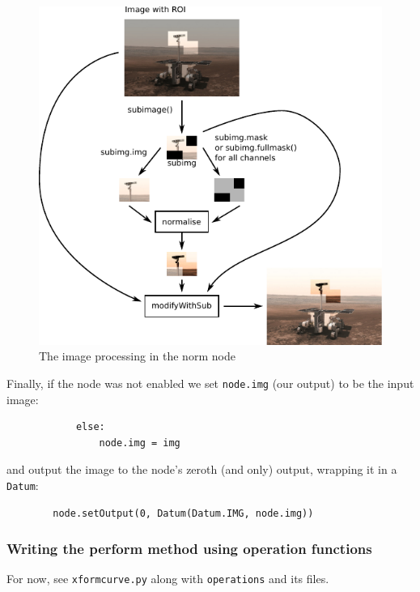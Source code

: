 \begin{figure}[ht]
\center
\includegraphics[width=5in]{norm.pdf}
\caption{The image processing in the norm node}
\label{norm.pdf}
\end{figure}
\clearpage
Finally, if the node was not enabled we set \texttt{node.img} (our output)
to be the input image:
\begin{lstlisting}
            else:
                node.img = img
\end{lstlisting}
and output the image to the node's zeroth (and only) output, wrapping it in
a \texttt{Datum}:
\begin{lstlisting}
        node.setOutput(0, Datum(Datum.IMG, node.img))
\end{lstlisting}


\subsubsection{Writing the perform method using operation functions}
\begin{notebox}
For now, see \texttt{xformcurve.py} along with \texttt{operations} and its 
files.
\end{notebox}

